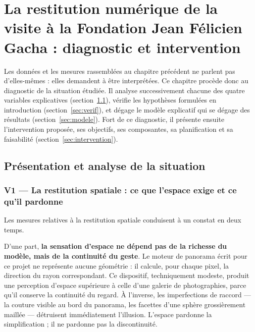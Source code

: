 \chapter{La restitution numérique de la visite à la Fondation Jean Félicien
Gacha : diagnostic et intervention}
\label{chap:diagnostic}

\introchap

Les données et les mesures rassemblées au chapitre précédent ne parlent pas
d'elles-mêmes : elles demandent à être interprétées. Ce chapitre procède donc au
diagnostic de la situation étudiée. Il analyse successivement chacune des quatre
variables explicatives (section~\ref{sec:analyse}), vérifie les hypothèses
formulées en introduction (section~\ref{sec:verif}), et dégage le modèle
explicatif qui se dégage des résultats (section~\ref{sec:modele}). Fort de ce
diagnostic, il présente ensuite l'intervention proposée, ses objectifs, ses
composantes, sa planification et sa faisabilité (section~\ref{sec:intervention}).

\section{Présentation et analyse de la situation}
\label{sec:analyse}

\subsection{V1 — La restitution spatiale : ce que l'espace exige et ce qu'il pardonne}

Les mesures relatives à la restitution spatiale conduisent à un constat en deux
temps.

D'une part, \textbf{la sensation d'espace ne dépend pas de la richesse du
modèle, mais de la continuité du geste}. Le moteur de panorama écrit pour ce
projet ne représente aucune géométrie : il calcule, pour chaque pixel, la
direction du rayon correspondant. Ce dispositif, techniquement modeste, produit
une perception d'espace supérieure à celle d'une galerie de photographies, parce
qu'il conserve la continuité du regard. À l'inverse, les imperfections de
raccord — la couture visible au bord du panorama, les facettes d'une sphère
grossièrement maillée — détruisent immédiatement l'illusion. L'espace pardonne
la simplification ; il ne pardonne pas la discontinuité.

